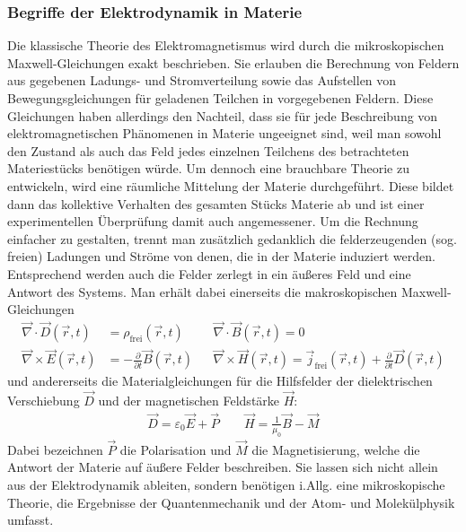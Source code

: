 \documentclass[german,  %
parskip=full,  %
]{scrartcl}
\begin{document}
\subsubsection{Begriffe der Elektrodynamik in Materie}
Die klassische Theorie des Elektromagnetismus wird durch die mikroskopischen Maxwell-Gleichungen exakt beschrieben. Sie erlauben die Berechnung von Feldern aus gegebenen Ladungs- und Stromverteilung sowie das Aufstellen von Bewegungsgleichungen für geladenen Teilchen in vorgegebenen Feldern. Diese Gleichungen haben allerdings den Nachteil, dass sie für jede Beschreibung von elektromagnetischen Phänomenen in Materie ungeeignet sind, weil man sowohl den Zustand als auch das Feld jedes einzelnen Teilchens des betrachteten Materiestücks benötigen würde. Um dennoch eine brauchbare Theorie zu entwickeln, wird eine räumliche Mittelung der Materie durchgeführt. Diese bildet dann das kollektive Verhalten des gesamten Stücks Materie ab und ist einer experimentellen Überprüfung damit auch angemessener. Um die Rechnung einfacher zu gestalten, trennt man zusätzlich gedanklich die felderzeugenden (sog. freien) Ladungen und Ströme von denen, die in der Materie induziert werden. Entsprechend werden auch die Felder zerlegt in ein äußeres Feld und eine Antwort des Systems. Man erhält dabei einerseits die makroskopischen Maxwell-Gleichungen
\begin{align*}
\vec{\nabla}\cdot\vec{D}(\vec{r},t) &= \rho_{\mathrm{frei}}(\vec{r},t)   && \vec{\nabla}\cdot\vec{B}(\vec{r},t) = 0 \\
\vec{\nabla}\times\vec{E}(\vec{r},t) &= -\frac{\partial}{\partial t}\vec{B}(\vec{r},t)    &&\vec{\nabla}\times\vec{H}(\vec{r},t) = \vec{j}_{\mathrm{frei}}(\vec{r},t) + \frac{\partial}{\partial t}\vec{D}(\vec{r},t) 
\end{align*}
und andererseits die Materialgleichungen für die Hilfsfelder der dielektrischen Verschiebung \(\vec{D}\) und der magnetischen Feldstärke \(\vec{H}\):
\begin{align*}
\vec{D} = \varepsilon_0 \vec{E} + \vec{P} \quad\quad \vec{H} = \frac{1}{\mu_0}\vec{B} - \vec{M}
\end{align*}
Dabei bezeichnen \(\vec{P}\) die Polarisation und \(\vec{M}\) die Magnetisierung, welche die Antwort der Materie auf äußere Felder beschreiben. Sie lassen sich nicht allein aus der Elektrodynamik ableiten, sondern benötigen i.Allg. eine mikroskopische Theorie, die Ergebnisse der Quantenmechanik und der Atom- und Molekülphysik umfasst. 
\end{document}

